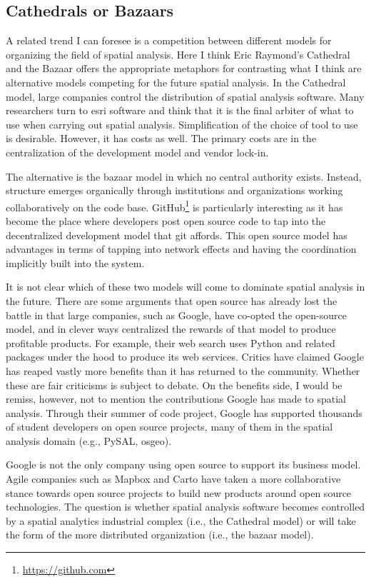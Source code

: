 \documentclass[11pt]{article}
\begin{document}
\subsection{Cathedrals or Bazaars}
\label{sec:orgbb69af0}
A related trend I can foresee is a competition between different models for
organizing the field of spatial analysis. Here I think Eric Raymond's Cathedral
and the Bazaar \cite{raymond_cathedral_1999-2} offers the appropriate
metaphors for contrasting what I think are alternative models competing for the
future spatial analysis. In the Cathedral model, large companies control the
distribution of spatial analysis software. Many researchers turn to esri
software and think that it is the final arbiter of what to use when carrying out
spatial analysis. Simplification of the choice of tool to use is desirable.
However, it has costs as well. The primary costs are in the centralization of
the development model and vendor lock-in.

The alternative is the bazaar model in which no central authority exists.
Instead, structure emerges organically through institutions and organizations
working collaboratively on the code base.
GitHub\footnote{\url{https://github.com}} is particularly interesting as it has
become the place where developers post open source code to tap into the
decentralized development model that git affords. This open source model has
advantages in terms of tapping into network effects and having the coordination
implicitly built into the system.


It is not clear which of these two models will come to dominate spatial analysis
in the future. There are some arguments that open source has already lost the
battle in that large companies, such as Google, have co-opted the open-source
model, and in clever ways centralized the rewards of that model to produce
profitable products\cite{Mark_2018}. For example, their web search uses Python
and related packages under the hood to produce its web services. Critics have
claimed Google has reaped vastly more benefits than it has returned to the
community. Whether these are fair criticisms is subject to debate. On the
benefits side, I would be remiss, however, not to mention the contributions
Google has made to spatial analysis. Through their summer of code project, Google
has supported thousands of
student developers  on open source projects, many of them in
the spatial analysis domain (e.g., PySAL, osgeo).

Google is not the only company using open source to support its business model.
Agile companies such as Mapbox and Carto  have taken a more
collaborative stance towards open source projects to build new products around
open source technologies. The question is whether spatial analysis software
becomes controlled by a spatial analytics industrial complex (i.e., the
Cathedral model) or will take the form of the more distributed organization
(i.e., the bazaar model).
\end{document}
